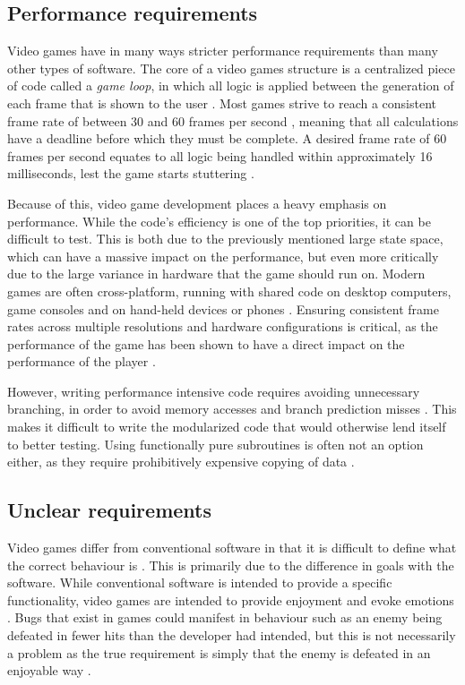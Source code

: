 \documentclass{article}
\begin{document}
    \subsection{Performance requirements}
    Video games have in many ways stricter performance requirements than many other types of software. The core of a video games structure is a centralized piece of code called a \emph{game loop}, in which all logic is applied between the generation of each frame that is shown to the user \parencite{varvaressos2017automated}. Most games strive to reach a consistent frame rate of between 30 and 60 frames per second \parencite{varvaressos2017automated}, meaning that all calculations have a deadline before which they must be complete. A desired frame rate of 60 frames per second equates to all logic being handled within approximately 16 milliseconds, lest the game starts stuttering \parencite{varvaressos2017automated}. 

    Because of this, video game development places a heavy emphasis on performance. While the code's efficiency is one of the top priorities, it can be difficult to test. This is both due to the previously mentioned large state space, which can have a massive impact on the performance, but even more critically due to the large variance in hardware that the game should run on. Modern games are often cross-platform, running with shared code on desktop computers, game consoles and on hand-held devices or phones \parencite{claypool2009perspectives}. Ensuring consistent frame rates across multiple resolutions and hardware configurations is critical, as the performance of the game has been shown to have a direct impact on the performance of the player \parencite{claypool2009perspectives}. 
    
    However, writing performance intensive code requires avoiding unnecessary branching, in order to avoid memory accesses and branch prediction misses \parencite{parsons2015tdd}. This makes it difficult to write the modularized code that would otherwise lend itself to better testing. Using functionally pure subroutines is often not an option either, as they require prohibitively expensive copying of data \parencite{carmack2012functional}.

    \subsection{Unclear requirements}
    Video games differ from conventional software in that it is difficult to define what the correct behaviour is \parencite{lewis2010went,murphy2014cowboys}. This is primarily due to the difference in goals with the software. While conventional software is intended to provide a specific functionality, video games are intended to provide enjoyment and evoke emotions \parencite{lewis2010went}. Bugs that exist in games could manifest in behaviour such as an enemy being defeated in fewer hits than the developer had intended, but this is not necessarily a problem as the true requirement is simply that the enemy is defeated in an enjoyable way \parencite{murphy2014cowboys}. 
    
\end{document}
